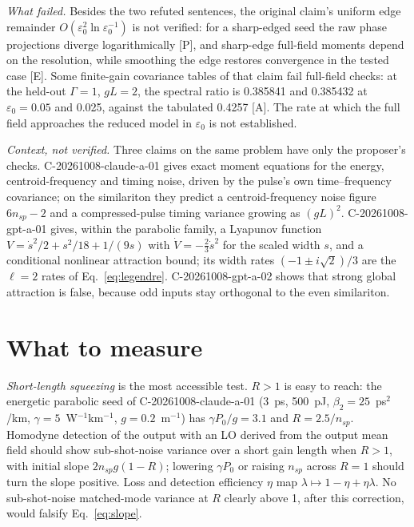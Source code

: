 \documentclass[aps,pra,twocolumn,superscriptaddress,nofootinbib,floatfix]{revtex4-2}
\newcommand{\nsp}{n_{sp}}
\newcommand{\eps}{\varepsilon_0}
\newcommand{\rk}[1]{[\textsf{#1}]}
\begin{document}
\textit{What failed.} Besides the two refuted sentences, the original claim's uniform edge remainder
$O(\eps^2\ln\eps^{-1})$ is not verified: for a sharp-edged seed the raw phase projections diverge logarithmically \rk{P},
and sharp-edge full-field moments depend on the resolution, while smoothing the edge restores convergence in the tested
case \rk{E}. Some finite-gain covariance tables of that claim fail full-field checks: at the held-out $\Gamma=1$, $gL=2$,
the spectral ratio is 0.385841 and 0.385432 at $\eps=0.05$ and 0.025, against the tabulated 0.4257 \rk{A}. The rate at which
the full field approaches the reduced model in $\eps$ is not established.

\textit{Context, not verified.} Three claims on the same problem have only the proposer's checks. C-20261008-claude-a-01
gives exact moment equations for the energy, centroid-frequency and timing noise, driven by the pulse's own
time--frequency covariance; on the similariton they predict a centroid-frequency noise figure $6\nsp-2$ and a
compressed-pulse timing variance growing as $(gL)^2$. C-20261008-gpt-a-01 gives, within the parabolic family, a Lyapunov
function $V=\dot s^2/2+s^2/18+1/(9s)$ with $\dot V=-\frac23\dot s^2$ for the scaled width $s$, and a conditional nonlinear
attraction bound; its width rates $(-1\pm i\sqrt2)/3$ are the $\ell=2$ rates of Eq.~\eqref{eq:legendre}.
C-20261008-gpt-a-02 shows that strong global attraction is false, because odd inputs stay orthogonal to the even
similariton.

\section{What to measure}\label{sec:outlook}

\textit{Short-length squeezing} is the most accessible test. $R>1$ is easy to reach: the energetic parabolic seed of
C-20261008-claude-a-01 (3~ps, 500~pJ, $\beta_2=25$~ps$^2$/km, $\gamma=5$~W$^{-1}$km$^{-1}$, $g=0.2$~m$^{-1}$) has
$\gamma P_0/g=3.1$ and $R=2.5/\nsp$. Homodyne detection of the output with an LO derived from the output mean field should
show sub-shot-noise variance over a short gain length when $R>1$, with initial slope $2\nsp g(1-R)$; lowering $\gamma P_0$
or raising $\nsp$ across $R=1$ should turn the slope positive. Loss and detection efficiency $\eta$ map
$\lambda\mapsto1-\eta+\eta\lambda$. No sub-shot-noise matched-mode variance at $R$ clearly above 1, after this correction,
would falsify Eq.~\eqref{eq:slope}.
\end{document}
